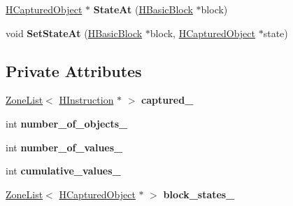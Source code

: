 \begin{DoxyCompactItemize}
\item 
\hyperlink{classv8_1_1internal_1_1_h_captured_object}{H\+Captured\+Object} $\ast$ {\bfseries State\+At} (\hyperlink{classv8_1_1internal_1_1_h_basic_block}{H\+Basic\+Block} $\ast$block)\hypertarget{classv8_1_1internal_1_1_h_escape_analysis_phase_abc56ece8953a0f701736263e73335ea5}{}\label{classv8_1_1internal_1_1_h_escape_analysis_phase_abc56ece8953a0f701736263e73335ea5}

\item 
void {\bfseries Set\+State\+At} (\hyperlink{classv8_1_1internal_1_1_h_basic_block}{H\+Basic\+Block} $\ast$block, \hyperlink{classv8_1_1internal_1_1_h_captured_object}{H\+Captured\+Object} $\ast$state)\hypertarget{classv8_1_1internal_1_1_h_escape_analysis_phase_a7f571f99737d338e7e53af94a69041d6}{}\label{classv8_1_1internal_1_1_h_escape_analysis_phase_a7f571f99737d338e7e53af94a69041d6}

\end{DoxyCompactItemize}
\subsection*{Private Attributes}
\begin{DoxyCompactItemize}
\item 
\hyperlink{classv8_1_1internal_1_1_zone_list}{Zone\+List}$<$ \hyperlink{classv8_1_1internal_1_1_h_instruction}{H\+Instruction} $\ast$ $>$ {\bfseries captured\+\_\+}\hypertarget{classv8_1_1internal_1_1_h_escape_analysis_phase_af3fc46ff1c4514aff2f127f8286473c3}{}\label{classv8_1_1internal_1_1_h_escape_analysis_phase_af3fc46ff1c4514aff2f127f8286473c3}

\item 
int {\bfseries number\+\_\+of\+\_\+objects\+\_\+}\hypertarget{classv8_1_1internal_1_1_h_escape_analysis_phase_a8e7e2fc70148abed823c8cf723684687}{}\label{classv8_1_1internal_1_1_h_escape_analysis_phase_a8e7e2fc70148abed823c8cf723684687}

\item 
int {\bfseries number\+\_\+of\+\_\+values\+\_\+}\hypertarget{classv8_1_1internal_1_1_h_escape_analysis_phase_a60bf7a38f8f81c703b41fd7ff0e7e1a0}{}\label{classv8_1_1internal_1_1_h_escape_analysis_phase_a60bf7a38f8f81c703b41fd7ff0e7e1a0}

\item 
int {\bfseries cumulative\+\_\+values\+\_\+}\hypertarget{classv8_1_1internal_1_1_h_escape_analysis_phase_ad29fe26d14b6248372df3e7efe5b712e}{}\label{classv8_1_1internal_1_1_h_escape_analysis_phase_ad29fe26d14b6248372df3e7efe5b712e}

\item 
\hyperlink{classv8_1_1internal_1_1_zone_list}{Zone\+List}$<$ \hyperlink{classv8_1_1internal_1_1_h_captured_object}{H\+Captured\+Object} $\ast$ $>$ {\bfseries block\+\_\+states\+\_\+}\hypertarget{classv8_1_1internal_1_1_h_escape_analysis_phase_a87a97b59536d404f4885703aa047d6e4}{}\label{classv8_1_1internal_1_1_h_escape_analysis_phase_a87a97b59536d404f4885703aa047d6e4}

\end{DoxyCompactItemize}
